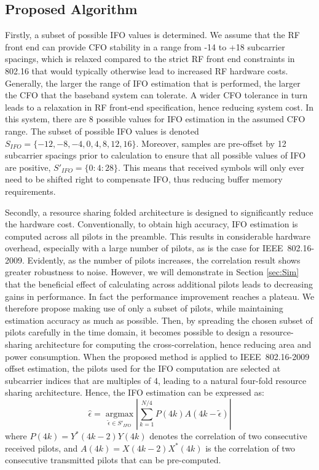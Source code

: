 \subsection{Proposed Algorithm}
Firstly, a subset of possible IFO values is determined.
We assume that the RF front end can provide CFO stability in a range from -14 to +18 subcarrier spacings, which is relaxed compared to the strict RF front end constraints in 802.16 that would typically otherwise lead to increased RF hardware costs.
Generally, the larger the range of IFO estimation that is performed, the larger the CFO that the baseband system can tolerate.
A wider CFO tolerance in turn leads to a relaxation in RF front-end specification, hence reducing system cost.
In this system, there are 8 possible values for IFO estimation in the assumed CFO range.
The subset of possible IFO values is denoted $S_{IFO} = \{-12, -8, -4, 0, 4, 8, 12, 16\}$.  Moreover, samples are pre-offset by 12 subcarrier spacings prior to calculation to ensure that all possible values of IFO are positive, $S'_{IFO} = \{0:4:28\}$.
This means that received symbols will only ever need to be shifted right to compensate IFO, thus reducing buffer memory requirements.

Secondly, a resource sharing folded architecture is designed to significantly reduce the hardware cost.
Conventionally, to obtain high accuracy, IFO estimation is computed across all pilots in the preamble.
This results in considerable hardware overhead, especially with a large number of pilots, as is the case for IEEE~802.16-2009.
Evidently, as the number of pilots increases, the correlation result shows greater robustness to noise.
However, we will demonstrate in Section \ref{sec:Sim} that the beneficial effect of calculating across additional pilots leads to decreasing gains in performance.
In fact the performance improvement reaches a plateau.
We therefore propose making use of only a subset of pilots, while maintaining estimation accuracy as much as possible.
Then, by spreading the chosen subset of pilots carefully in the time domain, it becomes possible to design a resource-sharing architecture for computing the cross-correlation, hence reducing area and power consumption.
When the proposed method is applied to IEEE~802.16-2009 offset estimation, the pilots used for the IFO computation are selected at subcarrier indices that are multiples of 4, leading to a natural four-fold resource sharing architecture.
Hence, the IFO estimation can be expressed as:
\begin{equation}
\label{integerCFOprop}
\hat{\epsilon} =\underset{\tilde{\epsilon} \in S'_{IFO}}{\operatorname{argmax}}  \left|\sum_{k=1}^{N/4} P(4k)  A(4k-\tilde{\epsilon})\right|
\end{equation}
where $P(4k) = Y^{*}(4k-2) Y(4k)$ denotes the correlation of two consecutive received pilots, and $A(4k) = X(4k-2) X^{*}(4k)$ is the correlation of two consecutive transmitted pilots that can be pre-computed.

